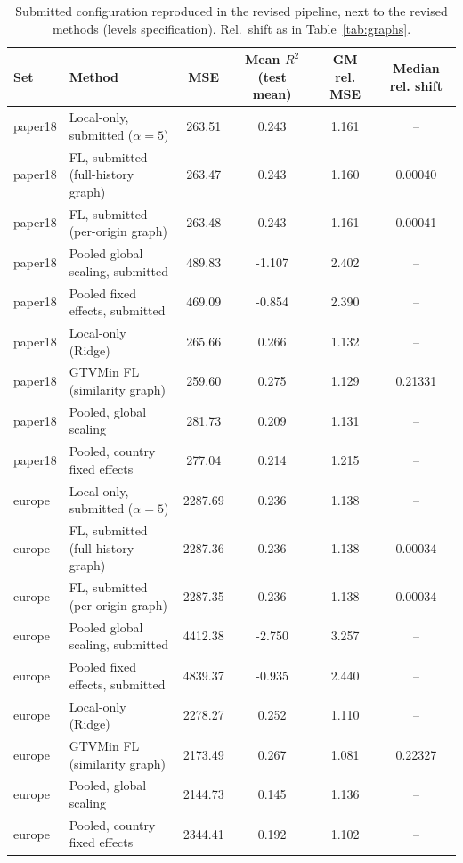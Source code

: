 \begin{table}[htbp]
\centering
\caption{Submitted configuration reproduced in the revised pipeline, next to the revised methods (levels specification). Rel.\ shift as in Table~\ref{tab:graphs}.}
\label{tab:submitted_vs_revised}
\begin{tabular}{llcccc}
\toprule
Set & Method & MSE & Mean $R^2$ (test mean) & GM rel. MSE & Median rel. shift \\
\midrule
paper18 & Local-only, submitted ($\alpha=5$) & 263.51 & 0.243 & 1.161 & -- \\
paper18 & FL, submitted (full-history graph) & 263.47 & 0.243 & 1.160 & 0.00040 \\
paper18 & FL, submitted (per-origin graph) & 263.48 & 0.243 & 1.161 & 0.00041 \\
paper18 & Pooled global scaling, submitted & 489.83 & -1.107 & 2.402 & -- \\
paper18 & Pooled fixed effects, submitted & 469.09 & -0.854 & 2.390 & -- \\
paper18 & Local-only (Ridge) & 265.66 & 0.266 & 1.132 & -- \\
paper18 & GTVMin FL (similarity graph) & 259.60 & 0.275 & 1.129 & 0.21331 \\
paper18 & Pooled, global scaling & 281.73 & 0.209 & 1.131 & -- \\
paper18 & Pooled, country fixed effects & 277.04 & 0.214 & 1.215 & -- \\
europe & Local-only, submitted ($\alpha=5$) & 2287.69 & 0.236 & 1.138 & -- \\
europe & FL, submitted (full-history graph) & 2287.36 & 0.236 & 1.138 & 0.00034 \\
europe & FL, submitted (per-origin graph) & 2287.35 & 0.236 & 1.138 & 0.00034 \\
europe & Pooled global scaling, submitted & 4412.38 & -2.750 & 3.257 & -- \\
europe & Pooled fixed effects, submitted & 4839.37 & -0.935 & 2.440 & -- \\
europe & Local-only (Ridge) & 2278.27 & 0.252 & 1.110 & -- \\
europe & GTVMin FL (similarity graph) & 2173.49 & 0.267 & 1.081 & 0.22327 \\
europe & Pooled, global scaling & 2144.73 & 0.145 & 1.136 & -- \\
europe & Pooled, country fixed effects & 2344.41 & 0.192 & 1.102 & -- \\
\bottomrule
\end{tabular}
\end{table}
